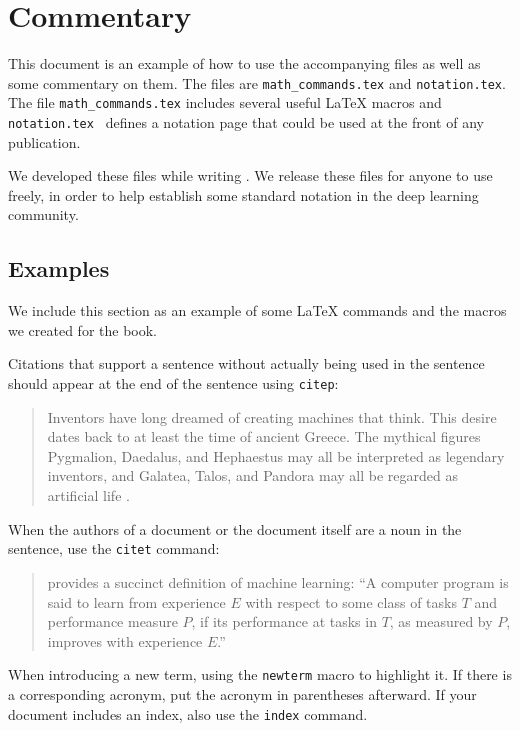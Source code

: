 \chapter{Commentary}
\label{chap:commentary}

This document is an example of how to use the accompanying files
as well as some commentary on them.
The files are {\tt math\_commands.tex} and {\tt notation.tex}.
The file {\tt math\_commands.tex} includes several useful {\LaTeX}
macros and {\tt notation.tex } defines a notation page that could
be used at the front of any publication.

We developed these files while writing \citet{dlbook}.
We release these files for anyone to use freely, in order to help
establish some standard notation in the deep learning community.


\section{Examples}
\label{sec:examples}

We include this section as an example of some {\LaTeX} commands
and the macros we created for the book.

Citations that support a sentence without actually being used in the sentence
should appear at the end of the sentence using {\tt citep}:

\begin{quote}
Inventors have long dreamed of creating machines that think.
This desire dates back to at least the time of ancient Greece.
The mythical figures Pygmalion, Daedalus, and Hephaestus may
all be interpreted as legendary inventors, and
Galatea, Talos, and Pandora may all be regarded as artificial
life \citep{ovid2004metamorphoses,sparkes1996red,1997works}.
\end{quote}

When the authors of a document or the document itself are a noun in the
sentence, use the {\tt citet} command:

\begin{quote}
\citet{Mitchell:1997:ML} provides a succinct definition of machine learning:
``A computer program is said to learn from experience $E$ with respect to some
class of tasks $T$ and performance measure $P$, if its performance at tasks in
$T$, as measured by $P$, improves with experience $E$.''
\end{quote}

When introducing a new term, using the {\tt newterm} macro to highlight it.
If there is a corresponding acronym, put the acronym in parentheses
afterward. If your document includes an index, also use the {\tt index}
command.

